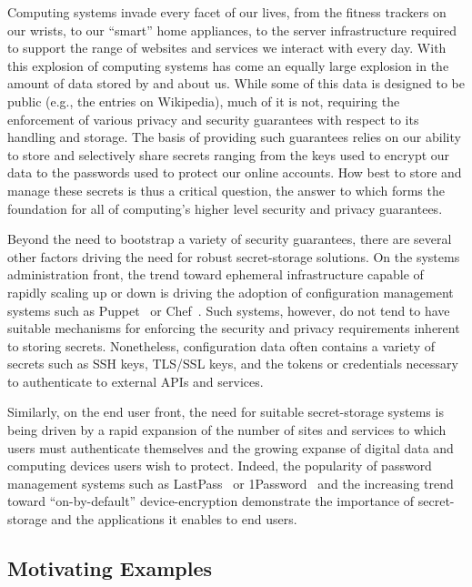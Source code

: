 Computing systems invade every facet of our lives, from the fitness
trackers on our wrists, to our ``smart'' home appliances, to the
server infrastructure required to support the range of websites and
services we interact with every day. With this explosion of computing
systems has come an equally large explosion in the amount of data
stored by and about us. While some of this data is designed to be
public (e.g., the entries on Wikipedia), much of it is not, requiring
the enforcement of various privacy and security guarantees with
respect to its handling and storage. The basis of providing such
guarantees relies on our ability to store and selectively share
secrets ranging from the keys used to encrypt our data to the
passwords used to protect our online accounts. How best to store and
manage these secrets is thus a critical question, the answer to which
forms the foundation for all of computing's higher level security and
privacy guarantees.

Beyond the need to bootstrap a variety of security guarantees, there
are several other factors driving the need for robust secret-storage
solutions. On the systems administration front, the trend toward
ephemeral infrastructure capable of rapidly scaling up or down is
driving the adoption of configuration management systems such as
Puppet~\cite{puppet} or Chef~\cite{chef}. Such systems, however, do
not tend to have suitable mechanisms for enforcing the security and
privacy requirements inherent to storing secrets. Nonetheless,
configuration data often contains a variety of secrets such as SSH
keys, TLS/SSL keys, and the tokens or credentials necessary to
authenticate to external APIs and services.

Similarly, on the end user front, the need for suitable secret-storage
systems is being driven by a rapid expansion of the number of sites
and services to which users must authenticate themselves and the
growing expanse of digital data and computing devices users wish to
protect. Indeed, the popularity of password management systems such as
LastPass~\cite{lastpass} or 1Password~\cite{onepassword} and the
increasing trend toward ``on-by-default'' device-encryption
demonstrate the importance of secret-storage and the applications it
enables to end users.

\subsection{Motivating Examples}


